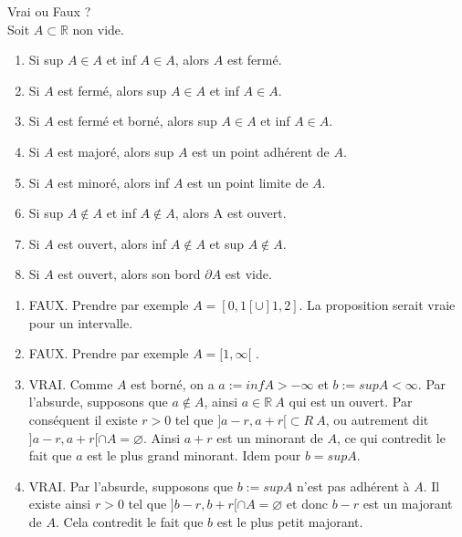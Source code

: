 \documentclass[12pt]{article}
\newcommand*{\xfield}[1]{\begin{mdframed}\centering #1\end{mdframed}\bigskip}
\newenvironment{note}{}{}
\begin{document}
\begin{note}
\xfield{Vrai ou Faux ?\\
Soit $A \subset \mathbb{R}$ non vide.\\
\begin{enumerate}
\item Si sup $A \in A$ et inf $A \in A$, alors $A$ est fermé.\\
\item Si $A$ est fermé, alors sup $A \in A$ et inf $A \in A$.\\
\item Si $A$ est fermé et borné, alors sup $A \in A$ et inf $A \in A$.\\
\item Si $A$ est majoré, alors sup $A$ est un point adhérent de $A$.\\
\item Si $A$ est minoré, alors inf $A$ est un point limite de $A$.\\
\item Si sup $A \not\in A$ et inf $A \not\in A$, alors A est ouvert.\\
\item Si $A$ est ouvert, alors inf $A \not\in A$ et sup $A \not\in A$.\\
\item Si $A$ est ouvert, alors son bord $\partial A$ est vide.
\end{enumerate} }
\xfield{\begin{enumerate}
\item FAUX.
Prendre par exemple $A = [0, 1[ \cup ]1, 2]$. La proposition serait vraie pour un intervalle.\\
\item FAUX.
Prendre par exemple $A = [1, \infty[$ . \\
\item VRAI.
Comme $A$ est borné, on a $a := inf A > -\infty$ et $b := sup A < \infty$. Par l’absurde, supposons
que $a \not\in A$, ainsi $a \in \mathbb{R} \ A$ qui est un ouvert. Par conséquent il existe $r > 0$ tel que $]a - r, a + r[ \subset R \ A$, ou autrement dit $]a - r, a + r[ \cap A = \varnothing$. Ainsi $a + r$ est un minorant de $A$, ce qui contredit le fait que $a$ est le plus grand minorant. Idem pour $b = sup A$.\\
\item VRAI.
Par l’absurde, supposons que $b := sup A$ n’est pas adhérent à $A$. Il existe ainsi $r > 0$ tel
que $]b - r, b + r[ \cap A = \varnothing$ et donc $b - r$ est un majorant de $A$. Cela contredit le fait que $b$ est le plus petit majorant.\\

\end{enumerate}}
\end{note}
\end{document}
